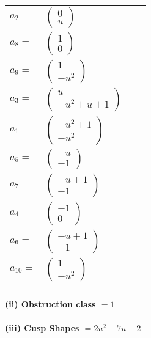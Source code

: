 \documentclass[1p]{elsarticle_modified}
\theoremstyle{definition}
\begin{document}
\begin{tabular}{m{7pt} m{180pt} m{7pt} m{180pt} }
\flushright $a_{2}=$&$\begin{pmatrix}0\\u\end{pmatrix}$ \\
\flushright $a_{8}=$&$\begin{pmatrix}1\\0\end{pmatrix}$ \\
\flushright $a_{9}=$&$\begin{pmatrix}1\\- u^2\end{pmatrix}$ \\
\flushright $a_{3}=$&$\begin{pmatrix}u\\- u^2+u+1\end{pmatrix}$ \\
\flushright $a_{1}=$&$\begin{pmatrix}- u^2+1\\- u^2\end{pmatrix}$ \\
\flushright $a_{5}=$&$\begin{pmatrix}- u\\-1\end{pmatrix}$ \\
\flushright $a_{7}=$&$\begin{pmatrix}- u+1\\-1\end{pmatrix}$ \\
\flushright $a_{4}=$&$\begin{pmatrix}-1\\0\end{pmatrix}$ \\
\flushright $a_{6}=$&$\begin{pmatrix}- u+1\\-1\end{pmatrix}$ \\
\flushright $a_{10}=$&$\begin{pmatrix}1\\- u^2\end{pmatrix}$\\&\end{tabular}
\flushleft \textbf{(ii) Obstruction class $= 1$}\\~\\
\flushleft \textbf{(iii) Cusp Shapes $= 2 u^2-7 u-2$}\\~\\
\end{document}
